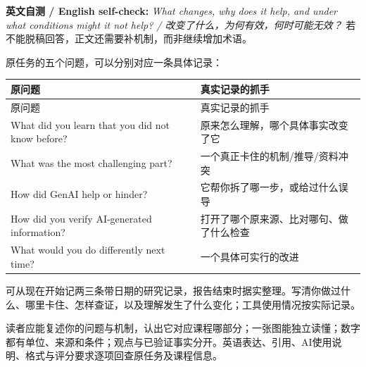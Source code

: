 \textbf{英文自测 / English self-check:} \emph{What changes, why does it help, and under what conditions might it not help? / 改变了什么，为何有效，何时可能无效？} 若不能脱稿回答，正文还需要补机制，而非继续增加术语。





原任务的五个问题，可以分别对应一条具体记录：


\begingroup
\small\setlength{\tabcolsep}{3pt}
\renewcommand{\arraystretch}{1.22}
\begin{longtable}{@{}>{\raggedright\arraybackslash}p{}>{\raggedright\arraybackslash}p{}@{}}
\toprule
原问题 & 真实记录的抓手 \\
\midrule\endfirsthead
原问题 & 真实记录的抓手 \\
\midrule\endhead
\bottomrule\endfoot
What did you learn that you did not know before? & 原来怎么理解，哪个具体事实改变了它 \\
What was the most challenging part? & 一个真正卡住的机制/推导/资料冲突 \\
How did GenAI help or hinder? & 它帮你拆了哪一步，或给过什么误导 \\
How did you verify AI-generated information? & 打开了哪个原来源、比对哪句、做了什么检查 \\
What would you do differently next time? & 一个具体可实行的改进 \\
\end{longtable}
\endgroup


可从现在开始记两三条带日期的研究记录，报告结束时据实整理。写清你做过什么、哪里卡住、怎样查证，以及理解发生了什么变化；工具使用情况按实际记录。





读者应能复述你的问题与机制，认出它对应课程哪部分；一张图能独立读懂；数字都有单位、来源和条件；观点与已验证事实分开。英语表达、引用、AI使用说明、格式与评分要求逐项回查原任务及课程信息。


